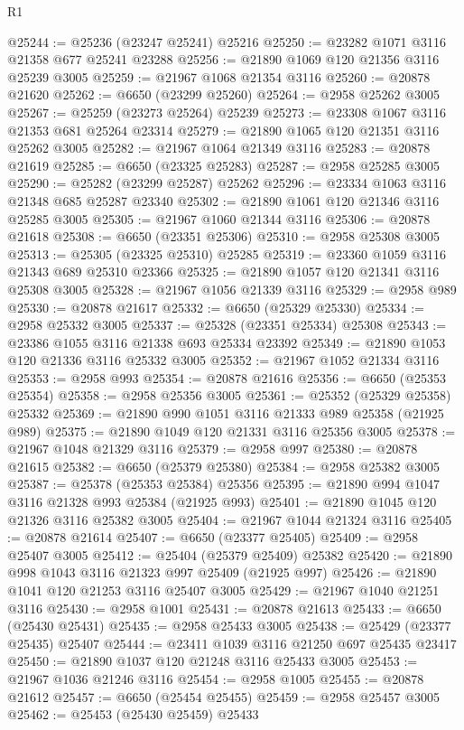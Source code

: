 \begin{lexlean}{R1}
\begin{coremodule}
@25244 := @25236 (@23247 @25241) @25216
@25250 := @23282 @1071 @3116 @21358 @677 @25241 @23288
@25256 := @21890 @1069 @120 @21356 @3116 @25239 @3005
@25259 := @21967 @1068 @21354 @3116
@25260 := @20878 @21620
@25262 := @6650 (@23299 @25260)
@25264 := @2958 @25262 @3005
@25267 := @25259 (@23273 @25264) @25239
@25273 := @23308 @1067 @3116 @21353 @681 @25264 @23314
@25279 := @21890 @1065 @120 @21351 @3116 @25262 @3005
@25282 := @21967 @1064 @21349 @3116
@25283 := @20878 @21619
@25285 := @6650 (@23325 @25283)
@25287 := @2958 @25285 @3005
@25290 := @25282 (@23299 @25287) @25262
@25296 := @23334 @1063 @3116 @21348 @685 @25287 @23340
@25302 := @21890 @1061 @120 @21346 @3116 @25285 @3005
@25305 := @21967 @1060 @21344 @3116
@25306 := @20878 @21618
@25308 := @6650 (@23351 @25306)
@25310 := @2958 @25308 @3005
@25313 := @25305 (@23325 @25310) @25285
@25319 := @23360 @1059 @3116 @21343 @689 @25310 @23366
@25325 := @21890 @1057 @120 @21341 @3116 @25308 @3005
@25328 := @21967 @1056 @21339 @3116
@25329 := @2958 @989
@25330 := @20878 @21617
@25332 := @6650 (@25329 @25330)
@25334 := @2958 @25332 @3005
@25337 := @25328 (@23351 @25334) @25308
@25343 := @23386 @1055 @3116 @21338 @693 @25334 @23392
@25349 := @21890 @1053 @120 @21336 @3116 @25332 @3005
@25352 := @21967 @1052 @21334 @3116
@25353 := @2958 @993
@25354 := @20878 @21616
@25356 := @6650 (@25353 @25354)
@25358 := @2958 @25356 @3005
@25361 := @25352 (@25329 @25358) @25332
@25369 := @21890 @990 @1051 @3116 @21333 @989 @25358 (@21925 @989)
@25375 := @21890 @1049 @120 @21331 @3116 @25356 @3005
@25378 := @21967 @1048 @21329 @3116
@25379 := @2958 @997
@25380 := @20878 @21615
@25382 := @6650 (@25379 @25380)
@25384 := @2958 @25382 @3005
@25387 := @25378 (@25353 @25384) @25356
@25395 := @21890 @994 @1047 @3116 @21328 @993 @25384 (@21925 @993)
@25401 := @21890 @1045 @120 @21326 @3116 @25382 @3005
@25404 := @21967 @1044 @21324 @3116
@25405 := @20878 @21614
@25407 := @6650 (@23377 @25405)
@25409 := @2958 @25407 @3005
@25412 := @25404 (@25379 @25409) @25382
@25420 := @21890 @998 @1043 @3116 @21323 @997 @25409 (@21925 @997)
@25426 := @21890 @1041 @120 @21253 @3116 @25407 @3005
@25429 := @21967 @1040 @21251 @3116
@25430 := @2958 @1001
@25431 := @20878 @21613
@25433 := @6650 (@25430 @25431)
@25435 := @2958 @25433 @3005
@25438 := @25429 (@23377 @25435) @25407
@25444 := @23411 @1039 @3116 @21250 @697 @25435 @23417
@25450 := @21890 @1037 @120 @21248 @3116 @25433 @3005
@25453 := @21967 @1036 @21246 @3116
@25454 := @2958 @1005
@25455 := @20878 @21612
@25457 := @6650 (@25454 @25455)
@25459 := @2958 @25457 @3005
@25462 := @25453 (@25430 @25459) @25433

\end{coremodule}
\end{lexlean}
